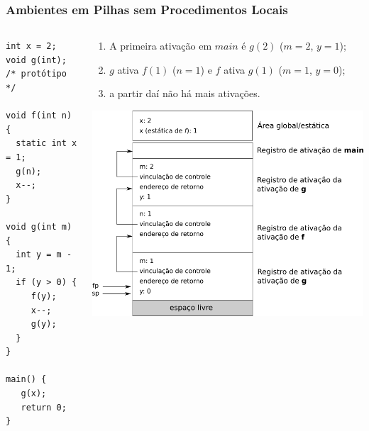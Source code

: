 \documentclass[table]{beamer}
\begin{document}
\begin{frame}[fragile]
   \frametitle{Ambientes em Pilhas sem Procedimentos Locais}
   \begin{columns}
   \begin{column}{0.4\textwidth}
   \scriptsize
   \begin{verbatim}
int x = 2;
void g(int); /* protótipo */

void f(int n) {
  static int x = 1;
  g(n);
  x--;
}

void g(int m) {
  int y = m - 1;
  if (y > 0) {
     f(y);
     x--;
     g(y);
  }
}

main() {
   g(x);
   return 0;
}
   \end{verbatim}
   \end{column}
   \begin{column}{0.6\textwidth}
   \scriptsize
   \begin{enumerate}
      \item A primeira ativação em $main$ é $g(2)$ ($m=2$, $y=1$);
      \item $g$ ativa $f(1)$ ($n=1$) e $f$ ativa $g(1)$ ($m=1$, $y=0$);
      \item a partir daí não há mais ativações. 
   \end{enumerate}
   \vspace{0.5cm}
   \includegraphics[scale=0.3]{figuras/ambientebaseadoempilhas02.png}
   \end{column}
   \end{columns}
\end{frame}
\end{document}
